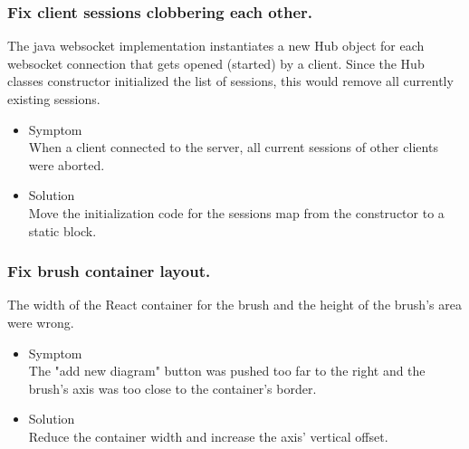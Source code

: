 \documentclass[oneside, english, final]{design}
\begin{document}
\subsubsection{Fix client sessions clobbering each other.}

The java websocket implementation instantiates a new Hub object for each websocket connection that gets opened (started) by a client. Since the Hub classes constructor initialized the list of sessions, this would remove all currently existing sessions.

\begin{itemize}
      \item{Symptom
            \\
            When a client connected to the server, all current sessions of other clients were aborted.
	}
      \item{Solution
            \\
            Move the initialization code for the sessions map from the constructor to a static block.
            }
\end{itemize}
\subsubsection{Fix brush container layout.}

The width of the React container for the brush and the height of the brush's area were wrong.

\begin{itemize}
      \item{Symptom
            \\
            The "add new diagram" button was pushed too far to the right and the brush's axis was too close to the container's border.
	}
      \item{Solution
            \\
            Reduce the container width and increase the axis' vertical offset.
            }
\end{itemize}


\newpage
\end{document}
